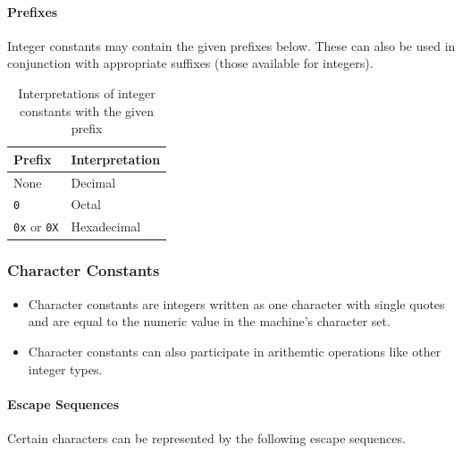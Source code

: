 \documentclass{article}
\newcommand{\code}[1]{\texttt{#1}}
\begin{document}
\paragraph{Prefixes} Integer constants may contain the given prefixes below. These can also be used in conjunction with appropriate suffixes (those available for integers).

\begin{table}[H]
    \centering
    \begin{tabular}{|l|l|}
        \hline
        \textbf{Prefix} & \textbf{Interpretation} \\
        \hline
        None & Decimal \\
        \code{0} & Octal \\
        \code{0x} or \code{0X} & Hexadecimal \\
        \hline
    \end{tabular}
    \caption{Interpretations of integer constants with the given prefix}
\end{table}

\subsubsection{Character Constants}

\begin{itemize}
    \item Character constants are integers written as one character with single quotes and are equal to the numeric value in the machine's character set.
    \item Character constants can also participate in arithemtic operations like other integer types.
\end{itemize}

\paragraph{Escape Sequences} Certain characters can be represented by the following escape sequences.
\end{document}
